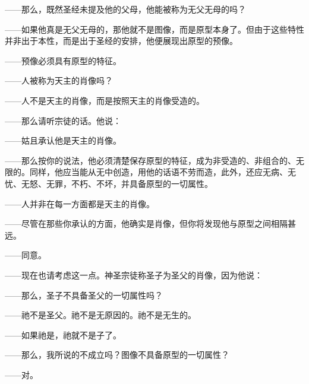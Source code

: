 ——那么，既然圣经未提及他的父母，他能被称为无父无母的吗？\par

——如果他真是无父无母的，那他就不是图像，而是原型本身了。但由于这些特性并非出于本性，而是出于圣经的安排，他便展现出原型的预像。\par

——预像必须具有原型的特征。\par

——人被称为天主的肖像吗？\par

——人不是天主的肖像，而是按照天主的肖像受造的。\par

——那么请听宗徒的话。他说：\par

——姑且承认他是天主的肖像。\par

——那么按你的说法，他必须清楚保存原型的特征，成为非受造的、非组合的、无限的。同样，他应当能从无中创造，用他的话语不劳而造，此外，还应无病、无忧、无怒、无罪，不朽、不坏，并具备原型的一切属性。\par

——人并非在每一方面都是天主的肖像。\par

——尽管在那些你承认的方面，他确实是肖像，但你将发现他与原型之间相隔甚远。\par

——同意。\par

——现在也请考虑这一点。神圣宗徒称圣子为圣父的肖像，因为他说：\par

——那么，圣子不具备圣父的一切属性吗？\par

——祂不是圣父。祂不是无原因的。祂不是无生的。\par

——如果祂是，祂就不是子了。\par

——那么，我所说的不成立吗？图像不具备原型的一切属性？\par

——对。\par

